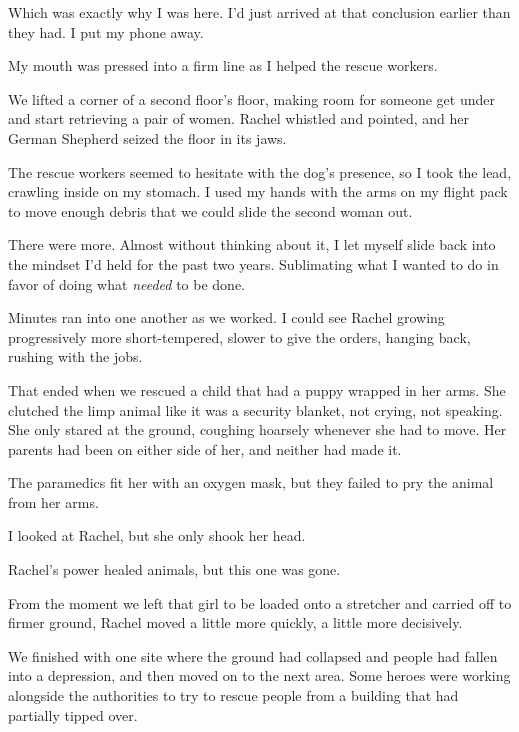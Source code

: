 Which was exactly why I was here.  I'd just arrived at that conclusion earlier than they had.  I put my phone away.



My mouth was pressed into a firm line as I helped the rescue workers.



We lifted a corner of a second floor's floor, making room for someone get under and start retrieving a pair of women.  Rachel whistled and pointed, and her German Shepherd seized the floor in its jaws.



The rescue workers seemed to hesitate with the dog's presence, so I took the lead, crawling inside on my stomach.  I used my hands with the arms on my flight pack to move enough debris that we could slide the second woman out.



There were more.  Almost without thinking about it, I let myself slide back into the mindset I'd held for the past two years.  Sublimating what I wanted to do in favor of doing what \emph{needed} to be done.



Minutes ran into one another as we worked.  I could see Rachel growing progressively more short-tempered, slower to give the orders, hanging back, rushing with the jobs.



That ended when we rescued a child that had a puppy wrapped in her arms.  She clutched the limp animal like it was a security blanket, not crying, not speaking.  She only stared at the ground, coughing hoarsely whenever she had to move.  Her parents had been on either side of her, and neither had made it.



The paramedics fit her with an oxygen mask, but they failed to pry the animal from her arms.



I looked at Rachel, but she only shook her head.



Rachel's power healed animals, but this one was gone.



From the moment we left that girl to be loaded onto a stretcher and carried off to firmer ground, Rachel moved a little more quickly, a little more decisively.



We finished with one site where the ground had collapsed and people had fallen into a depression, and then moved on to the next area.  Some heroes were working alongside the authorities to try to rescue people from a building that had partially tipped over.



